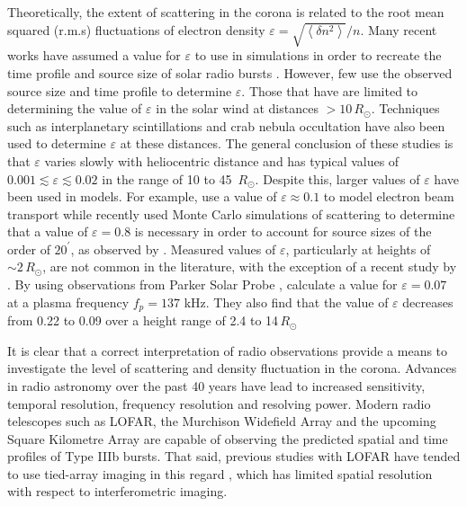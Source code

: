 Theoretically, the extent of scattering in the corona is related to the root mean squared (r.m.s) fluctuations of electron density $\varepsilon = \sqrt{\left< \delta n^2 \right>}/n$. Many recent works have assumed a value for $\varepsilon$ to use in simulations in order to recreate the time profile and source size of solar radio bursts \citep[e.g.][]{Krupar2018, Kontar2019}. However, few use the observed source size and time profile to determine $\varepsilon$. Those that have are limited to determining the value of $\varepsilon$ in the solar wind at distances $> 10 \, R_\odot$. Techniques such as interplanetary scintillations \citep[e.g.][]{Bisoi2014} and crab nebula occultation \citep{SasikumarRaja2016} have also been used to determine $\varepsilon$ at these distances. The general conclusion of these studies is that $\varepsilon$ varies slowly with heliocentric distance and has typical values of $0.001 \lesssim \varepsilon \lesssim 0.02$ in the range of 10 to 45 $\, R_\odot$. Despite this, larger values of $\varepsilon$ have been used in models. For example, \cite{Reid2010} use a value of $\varepsilon \approx 0.1$ to model electron beam transport while \cite{Kontar2019} recently used Monte Carlo simulations of scattering to determine that a value of $\varepsilon = 0.8$ is necessary in order to account for source sizes of the order of $20^\prime$, as observed by \cite{Kontar2017}. Measured values of $\varepsilon$, particularly at heights of ${\sim} 2 \, R_\odot$, are not common in the literature, with the exception of a recent study by \cite{Krupar2020}. By using observations from Parker Solar Probe \citep[PSP,][]{Fox2016}, \cite{Krupar2020} calculate a value for $\varepsilon = 0.07$ at a plasma frequency $f_p = 137$ kHz. They also find that the value of $\varepsilon$ decreases from 0.22 to 0.09 over a height range of 2.4 to 14$\, R_\odot$

It is clear that a correct interpretation of radio observations provide a means to investigate the level of scattering and density fluctuation in the corona. Advances in radio astronomy over the past 40 years have lead to increased sensitivity, temporal resolution, frequency resolution and resolving power. Modern radio telescopes such as LOFAR, the Murchison Widefield Array \citep[MWA;][]{Lonsdale2009} and the upcoming Square Kilometre Array \citep[SKA;][]{Dewdney2009} are capable of observing the predicted spatial and time profiles of Type IIIb bursts. That said, previous studies with LOFAR have tended to use tied-array imaging in this regard \citep{Kontar2017}, which has limited spatial resolution with respect to interferometric imaging.

